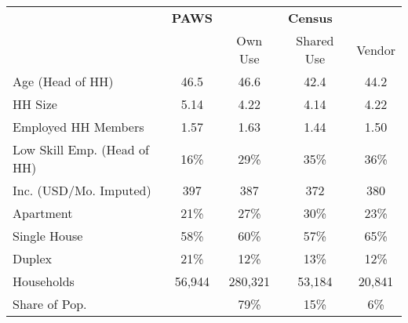 \begin{tabular}{lcccc}
\hline
\hline
 & \textbf{PAWS} & \multicolumn{3}{c}{ \textbf{Census} } \\ \cmidrule(r){2-2} \cmidrule(l){3-5}
 & &Own Use &Shared Use &Vendor  \\
\hline
\hline
Age (Head of HH) &       46.5  &       46.6  &       42.4  &       44.2   \\
HH Size &       5.14  &       4.22  &       4.14  &       4.22   \\
Employed HH Members &       1.57  &       1.63  &       1.44  &       1.50   \\
Low Skill Emp. (Head of HH) &         16\% &         29\% &         35\% &         36\%  \\
Inc. (USD/Mo. Imputed) &        397  &        387  &        372  &        380   \\
Apartment &         21\% &         27\% &         30\% &         23\%  \\
Single House &         58\% &         60\% &         57\% &         65\%  \\
Duplex &         21\% &         12\% &         13\% &         12\%  \\
Households &     56,944  &    280,321  &     53,184  &     20,841   \\
Share of Pop. &   &         79\% &         15\% &          6\%  \\
\hline
\hline
\end{tabular}